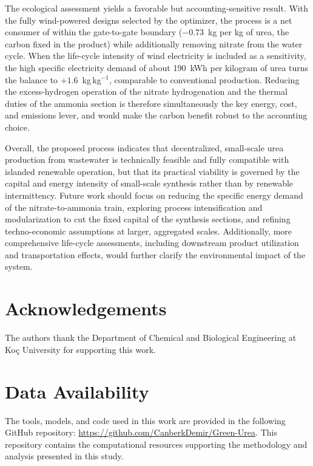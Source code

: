 \documentclass[letterpaper]{article}
\begin{document}
The ecological assessment yields a favorable but
accounting-sensitive result. With the fully wind-powered designs
selected by the optimizer, the process is a net consumer of 
within the gate-to-gate boundary ($-0.73$~kg per kg of urea,
the carbon fixed in the product) while additionally removing nitrate
from the water cycle. When the life-cycle intensity of wind
electricity is included as a sensitivity, the high specific
electricity demand of about 190~kWh per kilogram of urea turns the
balance to $+1.6$~kg\,kg$^{-1}$, comparable to conventional
production. Reducing the excess-hydrogen operation of the nitrate
hydrogenation and the thermal duties of the ammonia section is
therefore simultaneously the key energy, cost, and emissions lever,
and would make the carbon benefit robust to the accounting choice.

Overall, the proposed process indicates that decentralized,
small-scale urea production from wastewater is technically feasible
and fully compatible with islanded renewable operation, but that its
practical viability is governed by the capital and energy intensity
of small-scale synthesis rather than by renewable intermittency.
Future work should focus on reducing the specific energy demand of
the nitrate-to-ammonia train, exploring process intensification and
modularization to cut the fixed capital of the synthesis sections,
and refining techno-economic assumptions at larger, aggregated
scales. Additionally, more comprehensive life-cycle assessments,
including downstream product utilization and transportation effects,
would further clarify the environmental impact of the system.

\section*{Acknowledgements}

The authors thank the Department of Chemical and Biological
Engineering at Ko\c{c} University for supporting this work.

\section*{Data Availability}

The tools, models, and code used in this work are provided in the
following GitHub repository:
\url{https://github.com/CanberkDemir/Green-Urea}. This repository
contains the computational resources supporting the methodology and
analysis presented in this study.
\end{document}
